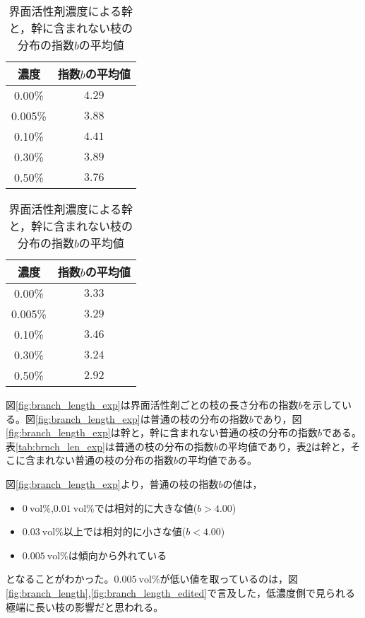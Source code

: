 \documentclass[autodetect-engine,dvi=dvipdfmx,a4paper,ja=standard,oneside,openany,11pt]{bxjsbook}
\begin{document}
\begin{table}[htbp]
  \begin{minipage}{0.45\textwidth}
    \centering
    \caption{界面活性剤濃度による普通の枝の分布の指数$b$の平均値}
    \begin{tabular}{|c|c|}
      \hline
      濃度      & 指数$b$の平均値 \\ \hline\hline
      0.00\%  & $4.29$    \\ \hline
      0.005\% & $3.88$    \\ \hline
      0.10\%  & $4.41$    \\ \hline
      0.30\%  & $3.89$    \\ \hline
      0.50\%  & $3.76$    \\
      \hline
    \end{tabular}
    \label{tab:brnch_len_exp}
  \end{minipage}
  \hfill
  \begin{minipage}{0.45\textwidth}
    \centering
    \caption{界面活性剤濃度による幹と，幹に含まれない枝の分布の指数$b$の平均値}
    \begin{tabular}{|c|c|}
      \hline
      濃度      & 指数$b$の平均値 \\ \hline\hline
      0.00\%  & $3.33$    \\ \hline
      0.005\% & $3.29$    \\ \hline
      0.10\%  & $3.46$    \\ \hline
      0.30\%  & $3.24$    \\ \hline
      0.50\%  & $2.92$    \\
      \hline
    \end{tabular}
    \label{tab:branch_len_exp_edited}
  \end{minipage}
\end{table}

図\ref{fig:branch_length_exp}は界面活性剤ごとの枝の長さ分布の指数$b$を示している。図\ref{fig:branch_length_exp}は普通の枝の分布の指数$b$であり，図\ref{fig:branch_length_exp}は幹と，幹に含まれない普通の枝の分布の指数$b$である。表\ref{tab:brnch_len_exp}は普通の枝の分布の指数$b$の平均値であり，表\ref{tab:branch_len_exp_edited}は幹と，そこに含まれない普通の枝の分布の指数$b$の平均値である。

図\ref{fig:branch_length_exp}より，普通の枝の指数$b$の値は，
\begin{itemize}
  \item $\SI{0}{\mathrm{vol}\%}$,$\SI{0.01}{\mathrm{vol}\%}$では相対的に大きな値($b>4.00$)
  \item $\SI{0.03}{\mathrm{vol}\%}$以上では相対的に小さな値($b<4.00$)
  \item $\SI{0.005}{\mathrm{vol}\%}$は傾向から外れている
\end{itemize}
となることがわかった。$\SI{0.005}{\mathrm{vol}\%}$が低い値を取っているのは，図\ref{fig:branch_length},\ref{fig:branch_length_edited}で言及した，低濃度側で見られる極端に長い枝の影響だと思われる。
\end{document}
